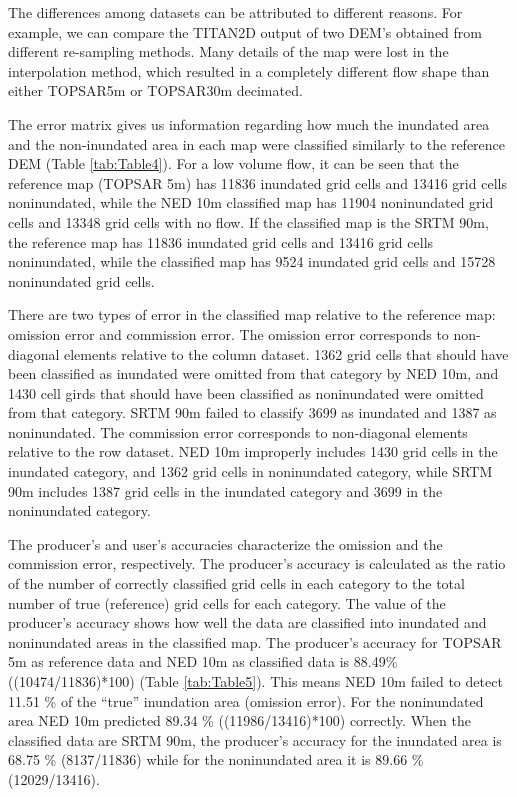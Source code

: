 \documentclass[12pt,letterpaper]{article}
\begin{document}
The differences among datasets can be attributed to different reasons.
For example, we can compare the TITAN2D output of two DEM's obtained
from different re-sampling methods. Many details of the map were lost in the
interpolation method, which resulted in a completely different flow
shape than either TOPSAR5m or TOPSAR30m decimated.

The error matrix gives us information regarding how much the inundated
area and the non-inundated area in each map were classified similarly
to the reference DEM (Table \ref{tab:Table4}).  For a low volume flow,
it can be seen that the reference map (TOPSAR 5m) has 11836 inundated
grid cells and 13416 grid cells noninundated, while the NED 10m classified map
has 11904 noninundated grid cells and 13348 grid cells with no flow. If the
classified map is the SRTM 90m, the reference map has 11836 inundated
grid cells and 13416 grid cells noninundated, while the classified map has
9524 inundated grid cells and 15728 noninundated grid cells.

There are two types of error in the classified map relative to the
reference map: omission error and commission error. The omission error
corresponds to non-diagonal elements relative to the column
dataset. 1362 grid cells that should have been classified as inundated
were omitted from that category by NED 10m, and 1430 cell girds that
should have been classified as noninundated were omitted from that
category. SRTM 90m failed to classify 3699 as inundated and 1387 as
noninundated. The commission error corresponds to non-diagonal
elements relative to the row dataset. NED 10m improperly includes 1430
grid cells in the inundated category, and 1362 grid cells in noninundated
category, while SRTM 90m includes 1387 grid cells in the inundated
category and 3699 in the noninundated category.


The producer's and user's accuracies characterize the omission and the
commission error, respectively. The producer's accuracy is calculated
as the ratio of the number of correctly classified grid cells in each
category to the total number of true (reference) grid cells for each
category.  The value of the producer's accuracy shows how well the
data are classified into inundated and noninundated areas in the
classified map. The producer's accuracy for TOPSAR 5m as reference
data and NED 10m as classified data is 88.49\% ((10474/11836)*100)
(Table \ref{tab:Table5}). This means NED 10m failed to detect 11.51 \%
of the ``true'' inundation area (omission error). For the noninundated
area NED 10m predicted 89.34 \% ((11986/13416)*100) correctly.  When
the classified data are SRTM 90m, the producer's accuracy for the
inundated area is 68.75 \% (8137/11836) while for the noninundated
area it is 89.66 \% (12029/13416).
\end{document}
